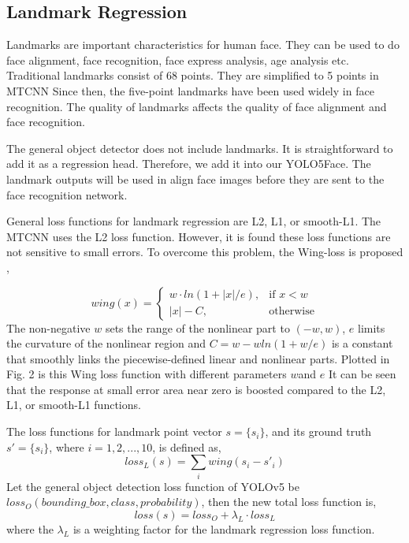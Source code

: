 \documentclass[conference]{IEEEtran}
\begin{document}
\subsection{Landmark Regression}

Landmarks are important characteristics for human face. They can be used to do face alignment, face recognition, face express analysis, age analysis etc. Traditional landmarks consist of 68 points. They are simplified to 5 points in MTCNN \cite{MTCNN} Since then, the five-point landmarks have been used widely in face recognition. The quality of landmarks affects the quality of face alignment and face recognition. 

The general object detector does not include landmarks. It is straightforward to add it as a regression head. Therefore, we add it into our YOLO5Face. The landmark outputs will be used in align face images before they are sent to the face recognition network. 

General loss functions for landmark regression are L2, L1, or smooth-L1. The MTCNN \cite{MTCNN} uses the L2 loss function.  However, it is found these loss functions are not sensitive to small errors. To overcome this problem, the Wing-loss is proposed \cite{wingloss},      

\begin{equation}
    wing(x)= 
\begin{cases}
    w \cdot ln(1+|x|/e) ,& \text{if } x < w\\
    |x|-C,              & \text{otherwise}
\end{cases}
\label{eq1}
\end{equation}
The non-negative $w$ sets the range of the nonlinear part to $(-w, w)$, $e$ limits the curvature of the nonlinear region and $C=w-w ln(1+w/e)$ is a constant that smoothly links the piecewise-defined linear and nonlinear parts. Plotted in Fig. 2 is this Wing loss function with different parameters $w$and $e$ It can be seen that the response at small error area near zero is boosted compared to the L2, L1, or smooth-L1 functions.   

The loss functions for landmark point vector  $s=\{s_i\}$, and its ground truth $s'=\{s_i\}$, where $i=1,2,...,10$, is defined as, 
\begin{equation}
    loss_L(s) = \sum_{i}{wing(s_i-s'_i)}
\label{eq2}
\end{equation}
Let the general object detection loss function of YOLOv5 be $loss_O(bounding\_box,class,probability)$, then the new total loss function is, 
\begin{equation}
    loss(s) = loss_O + \lambda_L\cdot loss_L
\label{eq3}
\end{equation}
where the $\lambda_L$ is a weighting factor for the landmark regression loss function. 
\end{document}
